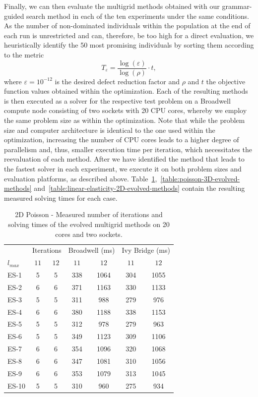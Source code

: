 Finally, we can then evaluate the multigrid methods obtained with our grammar-guided search method in each of the ten experiments under the same conditions.
As the number of non-dominated individuals within the population at the end of each run is unrestricted and can, therefore, be too high for a direct evaluation, we heuristically identify the 50 most promising individuals by sorting them according to the metric
\begin{equation}
	T_{\varepsilon} = \frac{\log(\varepsilon)}{\log(\rho)} \cdot t,
\end{equation}
where $\varepsilon = 10^{-12}$ is the desired defect reduction factor and $\rho$ and $t$ the objective function values obtained within the optimization.
Each of the resulting methods is then executed as a solver for the respective test problem on a Broadwell compute node consisting of two sockets with 20 CPU cores, whereby we employ the same problem size as within the optimization.
Note that while the problem size and computer architecture is identical to the one used within the optimization, increasing the number of CPU cores leads to a higher degree of parallelism and, thus, smaller execution time per iteration, which necessitates the reevaluation of each method.
After we have identified the method that leads to the fastest solver in each experiment, we execute it on both problem sizes and evaluation platforms, as described above.
Table~\ref{table:poisson-2D-evolved-methods},~\ref{table:poisson-3D-evolved-methods} and~\ref{table:linear-elasticity-2D-evolved-methods} contain the resulting measured solving times for each case.
\begin{table}
	\caption{2D Poisson - Measured number of iterations and solving times of the evolved multigrid methods on 20 cores and two sockets.}
	\label{table:poisson-2D-evolved-methods}
	\centering
	\begin{tabular}{l c c c c c c}
		\toprule
		& \multicolumn{2}{c}{Iterations} & \multicolumn{2}{c}{Broadwell (ms)} & \multicolumn{2}{c}{Ivy Bridge (ms)} \\
		\cmidrule(r){2-3} \cmidrule(r){4-5} \cmidrule(r){6-7}
		$l_{max}$ & $11$& $12$ & $11$ & $12$ & $11$ & $12$\\
		\midrule
		ES-1 & 5 & 5 & 338 & 1064 & 304 & 1055\\
		\midrule
		ES-2 & 6 & 6 & 371 & 1163 & 330 & 1133 \\
		\midrule
		ES-3 & 5 & 5 & 311 & 988 & 279 & 976 \\
		\midrule
		ES-4 & 6 & 6 & 380 & 1188 & 338 & 1153 \\
		\midrule
		ES-5 & 5 & 5 & 312 & 978 & 279 & 963 \\
		\midrule
		ES-6 & 5 & 5 & 349 & 1123 & 309 & 1106 \\
		\midrule
		ES-7 & 6 & 6 & 354 & 1096 & 320 & 1068 \\
		\midrule
		ES-8 & 6 & 6 & 347 & 1081 & 310 & 1056 \\
		\midrule
		ES-9 & 6 & 6 & 353 & 1079 & 313 & 1045 \\
		\midrule
		ES-10 & 5 & 5 & 310 & 960 & 275 & 934 \\
		\bottomrule
	\end{tabular}
\end{table}
